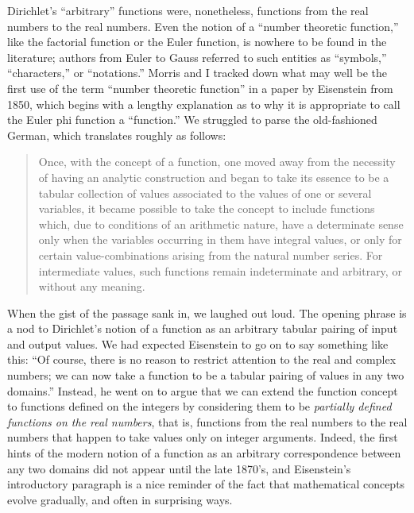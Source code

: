 \documentclass[12pt]{article}
\begin{document}
Dirichlet's ``arbitrary'' functions were, nonetheless, functions from the real numbers to the real numbers. Even the notion of a ``number theoretic function,'' like the factorial function or the Euler function, is nowhere to be found in the literature; authors from Euler to Gauss referred to such entities as ``symbols,'' ``characters,'' or ``notations.'' Morris and I tracked down what may well be the first use of the term ``number theoretic function'' in a paper by Eisenstein from 1850, which begins with a lengthy explanation as to why it is appropriate to call the Euler phi function a ``function.'' We struggled to parse the old-fashioned German, which translates roughly as follows:
\begin{quote}
Once, with the concept of a function, one moved away from the necessity of having an analytic construction and began to take its essence to be a tabular collection of values associated to the values of one or several variables, it became possible to take the concept to include functions which, due to conditions of an arithmetic nature, have a determinate sense only when the variables occurring in them have integral values, or only for certain value-combinations arising from the natural number series. For intermediate values, such functions remain indeterminate and arbitrary, or without any meaning. 
\end{quote}
When the gist of the passage sank in, we laughed out loud. The opening phrase is a nod to Dirichlet's notion of a function as an arbitrary tabular pairing of input and output values. We had expected Eisenstein to go on to say something like this: ``Of course, there is no reason to restrict attention to the real and complex numbers; we can now take a function to be a tabular pairing of values in any two domains.'' Instead, he went on to argue that we can extend the function concept to functions defined on the integers by considering them to be \emph{partially defined functions on the real numbers}, that is, functions from the real numbers to the real numbers that happen to take values only on integer arguments. Indeed, the first hints of the modern notion of a function as an arbitrary correspondence between any two domains did not appear until the late 1870's, and Eisenstein's introductory paragraph is a nice reminder of the fact that mathematical concepts evolve gradually, and often in surprising ways.
\end{document}
